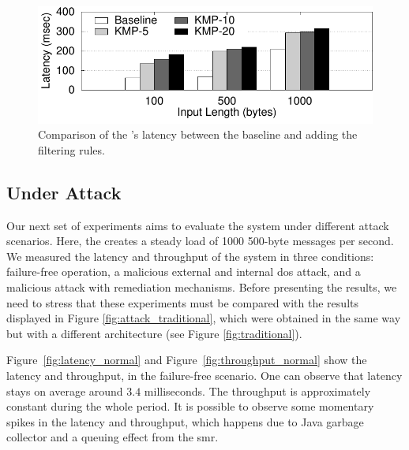 \begin{figure}[t]
\centering
\includegraphics[width=\columnwidth]{images/gnuplot/sieveq/new_plot_fw/fw.pdf}
\caption{Comparison of the \sieveq's latency between the baseline and adding the filtering rules.}
\label{fig:KMP}
\end{figure}


\subsection{\sieveq Under Attack}

Our next set of experiments aims to evaluate the system under different attack scenarios.
Here, the \sender creates a steady load of 1000 500-byte messages per second.
We measured the latency and throughput of the system in three conditions: failure-free operation, a malicious external and internal \gls{dos} attack, and a malicious attack with remediation mechanisms.
Before presenting the results, we need to stress that these experiments must be compared with the results displayed in Figure \ref{fig:attack_traditional}, which were obtained in the same way but with a different architecture (see Figure \ref{fig:traditional}).

Figure~\ref{fig:latency_normal} and Figure~\ref{fig:throughput_normal} show the latency and throughput, in the failure-free scenario.
One can observe that latency stays on average around $3.4$ milliseconds.
The throughput is approximately constant during the whole period.
It is possible to observe some momentary spikes in the latency and throughput, which happens due to Java garbage collector and a queuing effect from the \gls{smr}.

